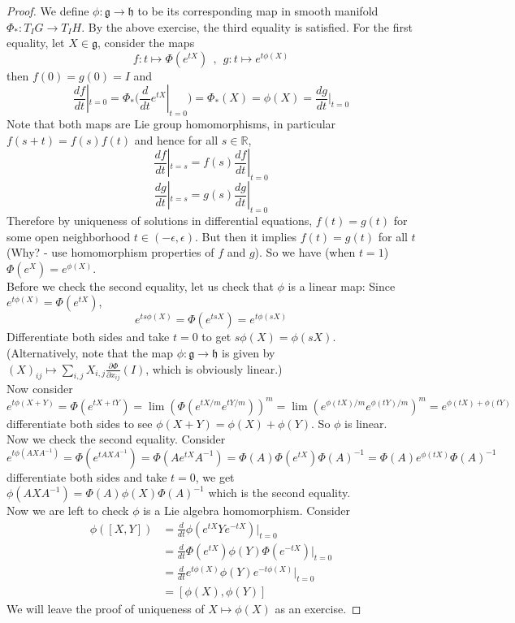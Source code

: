 \documentclass[11pt]{article}
\newcommand{\bb}[1]{\mathbb{#1}}
\newcommand{\mf}[1]{\mathfrak{#1}}
\begin{document}
\begin{proof}
We define $\phi: \mf{g} \to \mf{h}$ to be its corresponding map in smooth manifold $\Phi_*: T_IG \to T_IH$. By the above exercise, the third equality is satisfied. For the first equality, let $X \in \mf{g}$, consider the maps
$$f: t \mapsto \Phi(e^{tX})\ \ ,\ \ g:t \mapsto e^{t\phi(X)}$$
then $f(0) = g(0) = I$ and
$$\frac{df}{dt}|_{t = 0} = \Phi_* (\frac{d}{dt} e^{tX}|_{t = 0}) = \Phi_*(X) = \phi(X) = \frac{dg}{dt}|_{t = 0}$$
Note that both maps are Lie group homomorphisms, in particular $f(s+t) = f(s)f(t)$ and hence for all $s \in \bb{R}$,
$$\frac{df}{dt}|_{t = s} = f(s)\frac{df}{dt}|_{t=0}$$
$$\frac{dg}{dt}|_{t = s} = g(s)\frac{dg}{dt}|_{t = 0}$$
Therefore by uniqueness of solutions in differential equations, $f(t) = g(t)$ for some open neighborhood $t \in (-\epsilon, \epsilon)$. But then it implies $f(t) = g(t)$ for all $t$ (Why? - use homomorphism properties of $f$ and $g$). So we have (when $t=1$) $\Phi(e^X) = e^{\phi(X)}$.\\

Before we check the second equality, let us check that $\phi$ is a linear map: Since $e^{t\phi(X)} = \Phi(e^{tX})$,
$$e^{ts\phi(X)} = \Phi(e^{tsX}) = e^{t\phi(sX)}$$
Differentiate both sides and take $t = 0$ to get $s\phi(X) = \phi(sX)$.\\
(Alternatively, note that the map $\phi: \mf{g} \to \mf{h}$ is given by $(X)_{ij} \mapsto \sum_{i,j}X_{i,j} \frac{\partial \Phi}{\partial x_{ij}}(I)$, which is obviously linear.)\\
Now consider
$$e^{t\phi(X+Y)} = \Phi(e^{tX+tY}) = \lim (\Phi(e^{tX/m}e^{tY/m}))^m = \lim (e^{\phi(tX)/m}e^{\phi(tY)/m})^m = e^{\phi(tX) + \phi(tY)}$$
differentiate both sides to see $\phi(X+Y) = \phi(X) + \phi(Y)$. So $\phi$ is linear.\\

Now we check the second equality. Consider
$$e^{t\phi(AXA^{-1})} = \Phi(e^{tAXA^{-1}}) = \Phi(Ae^{tX}A^{-1}) = \Phi(A)\Phi(e^{tX})\Phi(A)^{-1} = \Phi(A)e^{\phi(tX)}\Phi(A)^{-1}$$
differentiate both sides and take $t = 0$, we get $\phi(AXA^{-1}) = \Phi(A)\phi(X)\Phi(A)^{-1}$ which is the second equality.\\

Now we are left to check $\phi$ is a Lie algebra homomorphism. Consider
\begin{align*}
\phi([X,Y]) &= \frac{d}{dt}\phi(e^{tX}Ye^{-tX})|_{t = 0}\\ &= \frac{d}{dt}\Phi(e^{tX})\phi(Y)\Phi(e^{-tX})|_{t = 0}\\ &= \frac{d}{dt} e^{t\phi(X)}\phi(Y)e^{-t\phi(X)}|_{t = 0}\\ &= [\phi(X), \phi(Y)]
\end{align*}
We will leave the proof of uniqueness of $X \mapsto \phi(X)$ as an exercise.
\end{proof}
\end{document}
